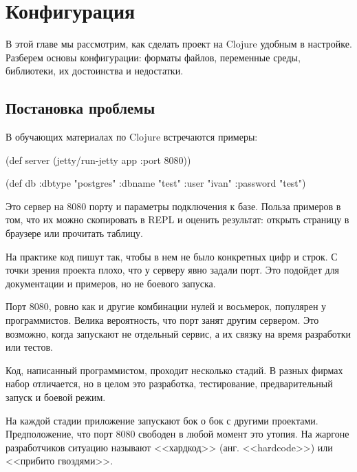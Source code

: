 \chapter{Конфигурация}

\label{chapter-config}

\begin{teaser}
В этой главе мы рассмотрим, как сделать проект на Clojure удобным в
настройке. Разберем основы конфигурации: форматы файлов, переменные среды,
библиотеки, их достоинства и недостатки.
\end{teaser}

\section{Постановка проблемы}

В обучающих материалах по Clojure встречаются примеры:

\begin{english}
  \begin{clojure}
(def server
  (jetty/run-jetty app {:port 8080}))

(def db {:dbtype   "postgres"
         :dbname   "test"
         :user     "ivan"
         :password "test"})
  \end{clojure}
\end{english}

Это сервер на 8080 порту и параметры подключения к базе. Польза примеров в том,
что их можно скопировать в REPL и оценить результат: открыть страницу в браузере
или прочитать таблицу.

На практике код пишут так, чтобы в нем не было конкретных цифр и строк. С точки
зрения проекта плохо, что у серверу явно задали порт. Это подойдет для
документации и примеров, но не боевого запуска.

Порт 8080, ровно как и другие комбинации нулей и восьмерок, популярен у
программистов. Велика вероятность, что порт занят другим сервером. Это возможно,
когда запускают не отдельный сервис, а их связку на время разработки или тестов.

Код, написанный программистом, проходит несколько стадий. В разных фирмах набор
отличается, но в целом это разработка, тестирование, предварительный запуск и
боевой режим.

На каждой стадии приложение запускают бок о бок с другими
проектами. Предположение, что порт 8080 свободен в любой момент это утопия. На
жаргоне разработчиков ситуацию называют <<хардкод>> (анг. <<hardcode>>) или
<<прибито гвоздями>>.

